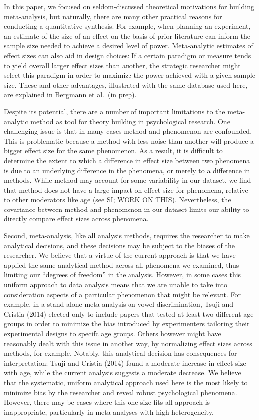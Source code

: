 \documentclass[english,floatsintext,man]{apa6}
\begin{document}
In this paper, we focused on seldom-discussed theoretical motivations
for building meta-analysis, but naturally, there are many other
practical reasons for conducting a quantitative synthesis. For example,
when planning an experiment, an estimate of the size of an effect on the
basis of prior literature can inform the sample size needed to achieve a
desired level of power. Meta-analytic estimates of effect sizes can also
aid in design choices: If a certain paradigm or measure tends to yield
overall larger effect sizes than another, the strategic researcher might
select this paradigm in order to maximize the power achieved with a
given sample size. These and other advantages, illustrated with the same
database used here, are explained in Bergmann et al.~(in prep).

Despite its potential, there are a number of important limitations to
the meta-analytic method as tool for theory building in psychological
research. One challenging issue is that in many cases method and
phenomenon are confounded. This is problematic because a method with
less noise than another will produce a bigger effect size for the same
phenomenon. As a result, it is difficult to determine the extent to
which a difference in effect size between two phenomena is due to an
underlying difference in the phenomena, or merely to a difference in
methods. While method may account for some variability in our dataset,
we find that method does not have a large impact on effect size for
phenomena, relative to other moderators like age (see SI; WORK ON THIS).
Nevertheless, the covariance between method and phenomenon in our
dataset limits our ability to directly compare effect sizes across
phenomena.

Second, meta-analysis, like all analysis methods, requires the
researcher to make analytical decisions, and these decisions may be
subject to the biases of the researcher. We believe that a virtue of the
current approach is that we have applied the same analytical method
across all phenomena we examined, thus limiting our \enquote{degrees of
freedom} in the analysis. However, in some cases this uniform approach
to data analysis means that we are unable to take into consideration
aspects of a particular phenomenon that might be relevant. For example,
in a stand-alone meta-analysis on vowel discrimination, Tsuji and
Cristia (2014) elected only to include papers that tested at least two
different age groups in order to minimize the bias introduced by
experimenters tailoring their experimental designs to specifc age
groups. Others however might have reasonably dealt with this issue in
another way, by normalizing effect sizes across methods, for example.
Notably, this analytical decision has consequences for interpretation:
Tsuji and Cristia (2014) found a moderate increase in effect size with
age, while the current analysis suggests a moderate decrease. We believe
that the systematic, uniform analytical approach used here is the most
likely to minimize bias by the researcher and reveal robust
psychological phenomena. However, there may be cases where this
one-size-fits-all approach is inappropriate, particularly in
meta-analyses with high heterogeneity.
\end{document}
